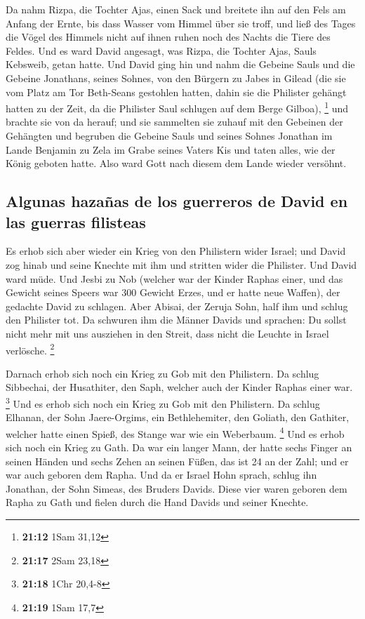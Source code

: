  Da nahm Rizpa, die Tochter Ajas, einen Sack und breitete
ihn auf den Fels am Anfang der Ernte, bis dass Wasser vom Himmel über
sie troff, und ließ des Tages die Vögel des Himmels nicht auf ihnen
ruhen noch des Nachts die Tiere des Feldes.  Und es ward
David angesagt, was Rizpa, die Tochter Ajas, Sauls Kebsweib, getan
hatte.  Und David ging hin und nahm die Gebeine Sauls und
die Gebeine Jonathans, seines Sohnes, von den Bürgern zu Jabes in Gilead
(die sie vom Platz am Tor Beth-Seans gestohlen hatten, dahin sie die
Philister gehängt hatten zu der Zeit, da die Philister Saul schlugen auf
dem Berge Gilboa), \footnote{\textbf{21:12} 1Sam 31,12} 
und brachte sie von da herauf; und sie sammelten sie zuhauf mit den
Gebeinen der Gehängten  und begruben die Gebeine Sauls
und seines Sohnes Jonathan im Lande Benjamin zu Zela im Grabe seines
Vaters Kis und taten alles, wie der König geboten hatte. Also ward Gott
nach diesem dem Lande wieder versöhnt.

\hypertarget{algunas-hazauxf1as-de-los-guerreros-de-david-en-las-guerras-filisteas}{%
\subsection{Algunas hazañas de los guerreros de David en las guerras
filisteas}\label{algunas-hazauxf1as-de-los-guerreros-de-david-en-las-guerras-filisteas}}

 Es erhob sich aber wieder ein Krieg von den Philistern
wider Israel; und David zog hinab und seine Knechte mit ihm und stritten
wider die Philister. Und David ward müde.  Und Jesbi zu
Nob (welcher war der Kinder Raphas einer, und das Gewicht seines Speers
war 300 Gewicht Erzes, und er hatte neue Waffen), der gedachte David zu
schlagen.  Aber Abisai, der Zeruja Sohn, half ihm und
schlug den Philister tot. Da schwuren ihm die Männer Davids und
sprachen: Du sollst nicht mehr mit uns ausziehen in den Streit, dass
nicht die Leuchte in Israel verlösche. \footnote{\textbf{21:17} 2Sam
  23,18}

 Darnach erhob sich noch ein Krieg zu Gob mit den
Philistern. Da schlug Sibbechai, der Husathiter, den Saph, welcher auch
der Kinder Raphas einer war. \footnote{\textbf{21:18} 1Chr 20,4-8}
 Und es erhob sich noch ein Krieg zu Gob mit den
Philistern. Da schlug Elhanan, der Sohn Jaere-Orgims, ein Bethlehemiter,
den Goliath, den Gathiter, welcher hatte einen Spieß, des Stange war wie
ein Weberbaum. \footnote{\textbf{21:19} 1Sam 17,7}  Und
es erhob sich noch ein Krieg zu Gath. Da war ein langer Mann, der hatte
sechs Finger an seinen Händen und sechs Zehen an seinen Füßen, das ist
24 an der Zahl; und er war auch geboren dem Rapha.  Und
da er Israel Hohn sprach, schlug ihn Jonathan, der Sohn Simeas, des
Bruders Davids.  Diese vier waren geboren dem Rapha zu
Gath und fielen durch die Hand Davids und seiner Knechte.

